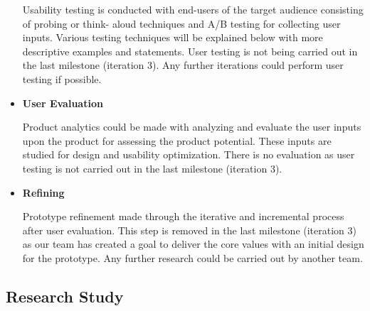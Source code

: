 \begin{itemize}
          \par Usability testing is conducted with end-users of the target audience consisting of probing or think-
          aloud techniques and A/B testing for collecting user inputs. Various testing techniques will be
          explained below with more descriptive examples and statements. User testing is not being carried out
          in the last milestone (iteration 3). Any further iterations could perform user testing if possible.
        \item \textbf{User Evaluation}
          \par Product analytics could be made with analyzing and evaluate the user inputs upon the product for
          assessing the product potential. These inputs are studied for design and usability optimization. There
          is no evaluation as user testing is not carried out in the last milestone (iteration 3).
        \item \textbf{Refining}
          \par Prototype refinement made through the iterative and incremental process after user evaluation. This step
          is removed in the last milestone (iteration 3) as our team has created a goal to deliver the core values
          with an initial design for the prototype. Any further research could be carried out by another team.
      \end{itemize}

  \subsection{Research Study}
